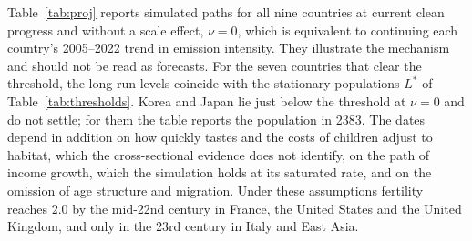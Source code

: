\documentclass[11pt]{article}
\begin{document}
Table~\ref{tab:proj} reports simulated paths for all nine countries at current clean progress and without
a scale effect, $\nu=0$, which is equivalent to continuing each country's 2005--2022 trend in emission
intensity. They illustrate the mechanism and should not be read as forecasts. For the seven countries that clear the threshold, the long-run levels coincide with the stationary
populations $L^\ast$ of Table~\ref{tab:thresholds}. Korea and Japan lie just below the threshold at
$\nu=0$ and do not settle; for them the table reports the population in 2383. The dates depend in addition on how quickly tastes and the
costs of children adjust to habitat, which the cross-sectional evidence does not identify, on the path of
income growth, which the simulation holds at its saturated rate, and on the omission of age structure and
migration. Under these assumptions fertility reaches $2.0$ by the mid-22nd century in France, the United
States and the United Kingdom, and only in the 23rd century in Italy and East Asia.
\end{document}

